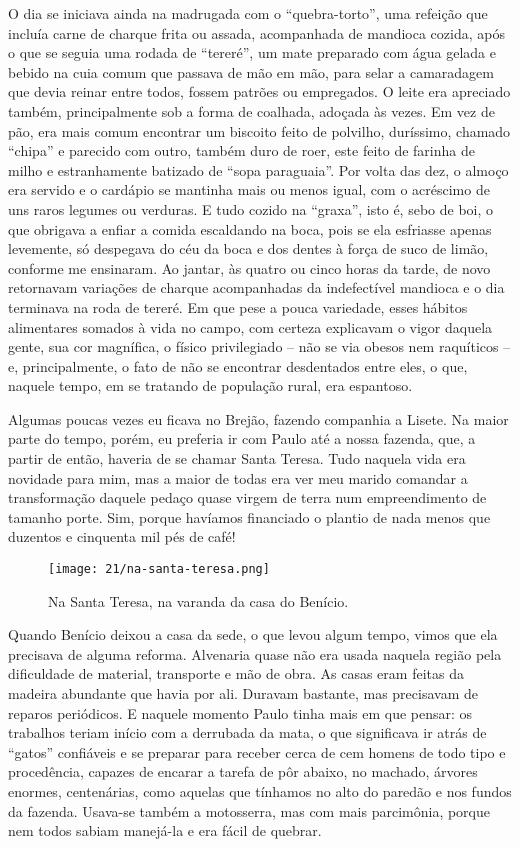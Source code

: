 O dia se iniciava ainda na madrugada com o ``quebra-torto'', uma refeição que incluía carne de charque frita ou assada, acompanhada de mandioca cozida, após o que se seguia uma rodada de ``tereré'', um mate preparado com água gelada e bebido na cuia comum que passava de mão em mão, para selar a camaradagem que devia reinar entre todos, fossem patrões ou empregados.
O leite era apreciado também, principalmente sob a forma de coalhada, adoçada às vezes.
Em vez de pão, era mais comum encontrar um biscoito feito de polvilho, duríssimo, chamado ``chipa'' e parecido com outro, também duro de roer, este feito de farinha de milho e estranhamente batizado de ``sopa paraguaia''.
Por volta das dez, o almoço era servido e o cardápio se mantinha mais ou menos igual, com o acréscimo de uns raros legumes ou verduras.
E tudo cozido na ``graxa'', isto é, sebo de boi, o que obrigava a enfiar a comida escaldando na boca, pois se ela esfriasse apenas levemente, só despegava do céu da boca e dos dentes à força de suco de limão, conforme me ensinaram.
Ao jantar, às quatro ou cinco horas da tarde, de novo retornavam variações de charque acompanhadas da indefectível mandioca e o dia terminava na roda de tereré.
Em que pese a pouca variedade, esses hábitos alimentares somados à vida no campo, com certeza explicavam o vigor daquela gente, sua cor magnífica, o físico privilegiado -- não se via obesos nem raquíticos -- e, principalmente, o fato de não se encontrar desdentados entre eles, o que, naquele tempo, em se tratando de população rural, era espantoso.

Algumas poucas vezes eu ficava no Brejão, fazendo companhia a Lisete.
Na maior parte do tempo, porém, eu preferia ir com Paulo até a nossa fazenda, que, a partir de então, haveria de se chamar Santa Teresa.
Tudo naquela vida era novidade para mim, mas a maior de todas era ver meu marido comandar a transformação daquele pedaço quase virgem de terra num empreendimento de tamanho porte.
Sim, porque havíamos financiado o plantio de nada menos que duzentos e cinquenta mil pés de café!

\begin{figure}
\centering
\texttt{[image: 21/na-santa-teresa.png]}
\caption{Na Santa Teresa, na varanda da casa do Benício.}
\end{figure}

Quando Benício deixou a casa da sede, o que levou algum tempo, vimos que ela precisava de alguma reforma.
Alvenaria quase não era usada naquela região pela dificuldade de material, transporte e mão de obra.
As casas eram feitas da madeira abundante que havia por ali.
Duravam bastante, mas precisavam de reparos periódicos.
E naquele momento Paulo tinha mais em que pensar: os trabalhos teriam início com a derrubada da mata, o que significava ir atrás de ``gatos'' confiáveis e se preparar para receber cerca de cem homens de todo tipo e procedência, capazes de encarar a tarefa de pôr abaixo, no machado, árvores enormes, centenárias, como aquelas que tínhamos no alto do paredão e nos fundos da fazenda.
Usava-se também a motosserra, mas com mais parcimônia, porque nem todos sabiam manejá-la e era fácil de quebrar.

